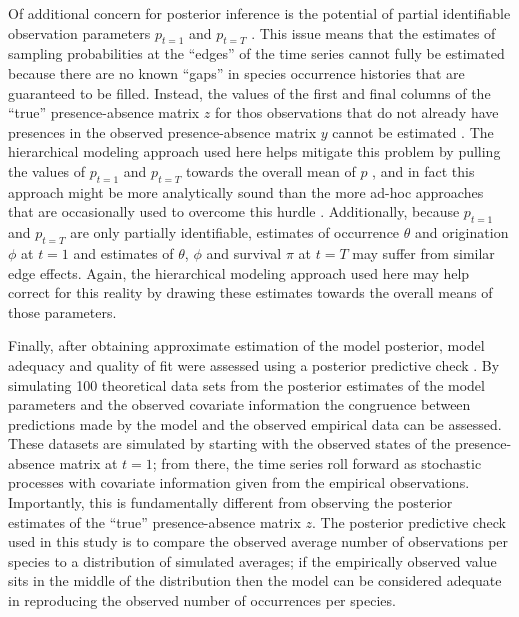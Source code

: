 \documentclass[12pt,letterpaper]{article}
\begin{document}
Of additional concern for posterior inference is the potential of partial identifiable observation parameters \(p_{t = 1}\) and \(p_{t = T}\) \citep{Royle2008}. This issue means that the estimates of sampling probabilities at the ``edges'' of the time series cannot fully be estimated because there are no known ``gaps'' in species occurrence histories that are guaranteed to be filled. Instead, the values of the first and final columns of the ``true'' presence-absence matrix \(z\) for thos observations that do not already have presences in the observed presence-absence matrix \(y\) cannot be estimated \citep{Royle2008}. The hierarchical modeling approach used here helps mitigate this problem by pulling the values of \(p_{t = 1}\) and \(p_{t = T}\) towards the overall mean of \(p\) \citep{Gelman2013d}, and in fact this approach might be more analytically sound than the more ad-hoc approaches that are occasionally used to overcome this hurdle \citep{Royle2008}. Additionally, because \(p_{t = 1}\) and \(p_{t = T}\) are only partially identifiable, estimates of occurrence \(\theta\) and origination \(\phi\) at \(t = 1\) and estimates of \(\theta\), \(\phi\) and survival \(\pi\) at \(t = T\) may suffer from similar edge effects. Again, the hierarchical modeling approach used here may help correct for this reality by drawing these estimates towards the overall means of those parameters.


Finally, after obtaining approximate estimation of the model posterior, model adequacy and quality of fit were assessed using a posterior predictive check \citep{Gelman2013d}. By simulating 100 theoretical data sets from the posterior estimates of the model parameters and the observed covariate information the congruence between predictions made by the model and the observed empirical data can be assessed. These datasets are simulated by starting with the observed states of the presence-absence matrix at \(t = 1\); from there, the time series roll forward as stochastic processes with covariate information given from the empirical observations. Importantly, this is fundamentally different from observing the posterior estimates of the ``true'' presence-absence matrix \(z\). The posterior predictive check used in this study is to compare the observed average number of observations per species to a distribution of simulated averages; if the empirically observed value sits in the middle of the distribution then the model can be considered adequate in reproducing the observed number of occurrences per species. 
\end{document}
